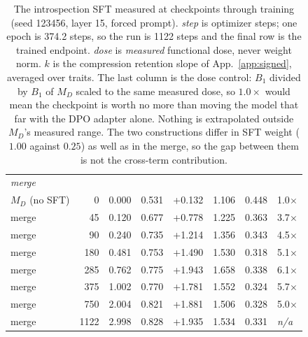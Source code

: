 \begin{table}[t]
\begin{tabular}{lrrrrrrl}
\midrule
\multicolumn{8}{l}{\emph{merge}} \\
$M_D$ (no SFT) & 0 & 0.000 & 0.531 & +0.132 & 1.106 & 0.448 & 1.0$\times$ \\
merge & 45 & 0.120 & 0.677 & +0.778 & 1.225 & 0.363 & 3.7$\times$ \\
merge & 90 & 0.240 & 0.735 & +1.214 & 1.356 & 0.343 & 4.5$\times$ \\
merge & 180 & 0.481 & 0.753 & +1.490 & 1.530 & 0.318 & 5.1$\times$ \\
merge & 285 & 0.762 & 0.775 & +1.943 & 1.658 & 0.338 & 6.1$\times$ \\
merge & 375 & 1.002 & 0.770 & +1.781 & 1.552 & 0.324 & 5.7$\times$ \\
merge & 750 & 2.004 & 0.821 & +1.881 & 1.506 & 0.328 & 5.0$\times$ \\
merge & 1122 & 2.998 & 0.828 & +1.935 & 1.534 & 0.331 & \textit{n/a} \\
\bottomrule
\end{tabular}
\caption{The introspection SFT measured at checkpoints through training (seed 123456, layer 15, forced prompt). \emph{step} is optimizer steps; one epoch is 374.2 steps, so the run is 1122 steps and the final row is the trained endpoint. \emph{dose} is \emph{measured} functional dose, never weight norm. $k$ is the compression retention slope of App.~\ref{app:signed}, averaged over traits. The last column is the dose control: $B_1$ divided by $B_1$ of $M_D$ scaled to the same measured dose, so $1.0\times$ would mean the checkpoint is worth no more than moving the model that far with the DPO adapter alone. Nothing is extrapolated outside $M_D$'s measured range. The two constructions differ in SFT weight ($1.00$ against $0.25$) as well as in the merge, so the gap between them is not the cross-term contribution.}
\label{tab:oct-sft-curve}
\end{table}
